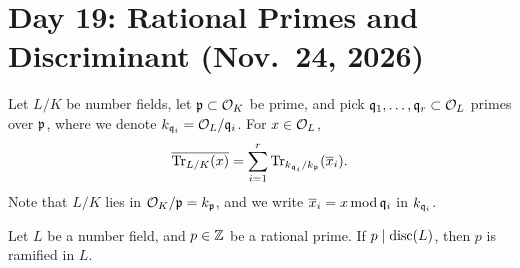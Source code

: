 \section{Day 19: Rational Primes and Discriminant (Nov.\ 24, 2026)}
Let $L/K$ be number fields, let $\mathfrak p \subset \mathcal O_K$ be prime, and pick $\mathfrak q_1, \dots, \mathfrak q_r \subset \mathcal O_L$ primes over $\mathfrak p$, where we denote $k_{\mathfrak q_i} = \mathcal O_L / \mathfrak q_i$. For $x \in \mathcal O_L$,
\[ \overline{\operatorname{Tr}_{L/K}(x)} = \sum_{i=1}^r \operatorname{Tr}_{k_{\mathfrak q_i}/k_\mathfrak p}(\overline x_i). \]
Note that $L/K$ lies in $\mathcal O_K/\mathfrak p = k_\mathfrak p$, and we write $\overline x_i = x \operatorname{mod} \mathfrak q_i$ in $k_{\mathfrak q_i}$.

\begin{theorem} \label{thm:rational_prime_discriminant_ramification}
    Let $L$ be a number field, and $p \in \mathbb Z$ be a rational prime. If $p \mid \operatorname{disc}(L)$, then $p$ is ramified in $L$.
\end{theorem}

